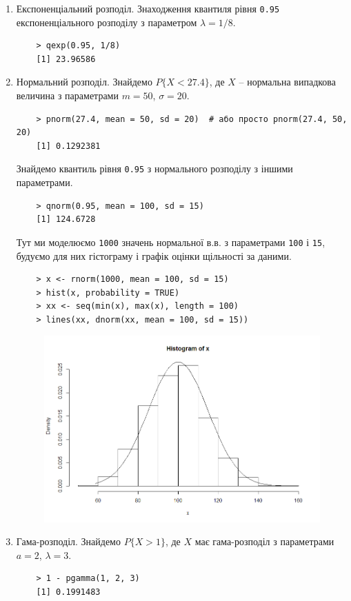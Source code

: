 \documentclass[a4paper, 12pt]{article}
\begin{document}
\begin{enumerate}
	\item Експоненціальний розподіл. Знаходження квантиля рівня \verb|0.95| експоненціального розподілу з параметром $\lambda = 1 / 8$.
	\begin{verbatim}
	> qexp(0.95, 1/8)
	[1] 23.96586
	\end{verbatim}

	\item Нормальний розподіл. Знайдемо $P \{ X < 27.4\}$, де $X$ -- нормальна випадкова величина з параметрами $m = 50$, $\sigma = 20$.
	\begin{verbatim}
	> pnorm(27.4, mean = 50, sd = 20)  # або просто pnorm(27.4, 50, 20)
	[1] 0.1292381
	\end{verbatim}

	Знайдемо квантиль рівня \verb|0.95| з нормального розподілу з іншими параметрами.
	\begin{verbatim}
	> qnorm(0.95, mean = 100, sd = 15)
	[1] 124.6728
	\end{verbatim}

	Тут ми моделюємо \verb|1000| значень нормальної в.в. з параметрами \verb|100| і \verb|15|, будуємо для них гістограму і графік оцінки щільності за даними.
	\begin{verbatim}
	> x <- rnorm(1000, mean = 100, sd = 15)
	> hist(x, probability = TRUE)
	> xx <- seq(min(x), max(x), length = 100)
	> lines(xx, dnorm(xx, mean = 100, sd = 15))
	\end{verbatim}
	\begin{figure}[H]
		\centering
		\includegraphics[width=\linewidth]{mal-01.png}
	\end{figure}

	\item Гама-розподіл. Знайдемо $P \{ X > 1 \}$, де $X$ має гама-розподіл з параметрами $ a = 2$, $\lambda = 3$.
	\begin{verbatim}
	> 1 - pgamma(1, 2, 3)
	[1] 0.1991483
	\end{verbatim}


\end{enumerate}
\end{document}
